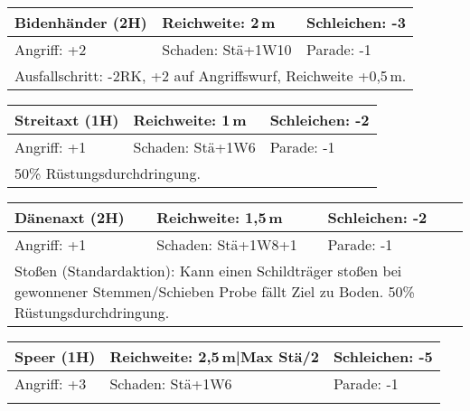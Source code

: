 \documentclass[../../Heldenanleitung2]{subfiles}
\begin{document}
\newline \newline\newline
\begin{tabular}{|p{}|p{}|p{}|}
\hline
\textbf{Bidenhänder (2H)} & Reichweite: 2\,m & Schleichen: -3\\
\hline
Angriff: +2 & Schaden: Stä+1W10 & Parade: -1\\
\hline
\multicolumn{3}{|p{0.99\textwidth}|}{Ausfallschritt: -2RK, +2 auf Angriffswurf, Reichweite +0,5\,m.} \\
\hline
\end{tabular}
\newline \newline\newline
\begin{tabular}{|p{}|p{}|p{}|}
\hline
\textbf{Streitaxt (1H)} & Reichweite: 1\,m & Schleichen: -2\\
\hline
Angriff: +1 & Schaden: Stä+1W6 & Parade: -1\\
\hline
\multicolumn{3}{|p{0.99\textwidth}|}{50\% Rüstungsdurchdringung.} \\
\hline
\end{tabular}
\newline \newline\newline
\begin{tabular}{|p{}|p{}|p{}|}
\hline
\textbf{Dänenaxt (2H)} & Reichweite: 1,5\,m & Schleichen: -2\\
\hline
Angriff: +1 & Schaden: Stä+1W8+1 & Parade: -1\\
\hline
\multicolumn{3}{|p{0.99\textwidth}|}{Stoßen (Standardaktion): Kann einen Schildträger stoßen bei gewonnener Stemmen/Schieben Probe fällt Ziel zu Boden. 50\% Rüstungsdurchdringung.} \\
\hline
\end{tabular}
\newline \newline\newline
\begin{tabular}{|p{}|p{}|p{}|}
\hline
\textbf{Speer (1H)} & Reichweite: 2,5\,m|Max Stä/2 & Schleichen: -5\\
\hline
Angriff: +3 & Schaden: Stä+1W6 & Parade: -1\\
\hline
\multicolumn{3}{|p{0.99\textwidth}|}{} \\
\hline
\end{tabular}
\end{document}
